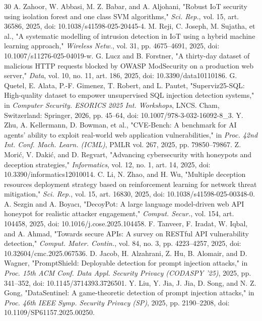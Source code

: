 \begin{small}
\begin{thebibliography}{30}
		A. Zahoor, W. Abbasi, M. Z. Babar, and A. Aljohani, "Robust IoT security using isolation forest and one class SVM algorithms," \textit{Sci. Rep.}, vol. 15, art. 36586, 2025, doi: 10.1038/s41598-025-20445-4.
		M. Reji, C. Joseph, M. Sujatha, et al., "A systematic modelling of intrusion detection in IoT using a hybrid machine learning approach," \textit{Wireless Netw.}, vol. 31, pp. 4675--4691, 2025, doi: 10.1007/s11276-025-04019-w.
		G. Lucz and B. Forstner, "A thirty-day dataset of malicious HTTP requests blocked by OWASP ModSecurity on a production web server," \textit{Data}, vol. 10, no. 11, art. 186, 2025, doi: 10.3390/data10110186.
		G. Quetel, E. Alata, P.-F. Gimenez, T. Robert, and L. Pautet, "Superviz25-SQL: High-quality dataset to empower unsupervised SQL injection detection systems," in \textit{Computer Security. ESORICS 2025 Int. Workshops}, LNCS. Cham, Switzerland: Springer, 2026, pp. 45--64, doi: 10.1007/978-3-032-16092-8_3.
		Y. Zhu, A. Kellermann, D. Bowman, et al., "CVE-Bench: A benchmark for AI agents' ability to exploit real-world web application vulnerabilities," in \textit{Proc. 42nd Int. Conf. Mach. Learn. (ICML)}, PMLR vol. 267, 2025, pp. 79850--79867.
		Z. Morić, V. Dakić, and D. Regvart, "Advancing cybersecurity with honeypots and deception strategies," \textit{Informatics}, vol. 12, no. 1, art. 14, 2025, doi: 10.3390/informatics12010014.
		C. Li, N. Zhao, and H. Wu, "Multiple deception resources deployment strategy based on reinforcement learning for network threat mitigation," \textit{Sci. Rep.}, vol. 15, art. 16830, 2025, doi: 10.1038/s41598-025-00348-0.
		A. Sezgin and A. Boyacı, "DecoyPot: A large language model-driven web API honeypot for realistic attacker engagement," \textit{Comput. Secur.}, vol. 154, art. 104458, 2025, doi: 10.1016/j.cose.2025.104458.
		F. Tanveer, F. Iradat, W. Iqbal, and A. Ahmad, "Towards secure APIs: A survey on RESTful API vulnerability detection," \textit{Comput. Mater. Contin.}, vol. 84, no. 3, pp. 4223--4257, 2025, doi: 10.32604/cmc.2025.067536.
		D. Jacob, H. Alzahrani, Z. Hu, B. Alomair, and D. Wagner, "PromptShield: Deployable detection for prompt injection attacks," in \textit{Proc. 15th ACM Conf. Data Appl. Security Privacy (CODASPY '25)}, 2025, pp. 341--352, doi: 10.1145/3714393.3726501.
		Y. Liu, Y. Jia, J. Jia, D. Song, and N. Z. Gong, "DataSentinel: A game-theoretic detection of prompt injection attacks," in \textit{Proc. 46th IEEE Symp. Security Privacy (SP)}, 2025, pp. 2190--2208, doi: 10.1109/SP61157.2025.00250.

\end{thebibliography}
\end{small}

